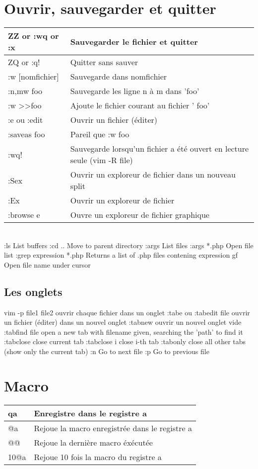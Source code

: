 \documentclass{article}
\begin{document}
\section{Ouvrir, sauvegarder et quitter}
\begin{tabular}{|p{3cm}| l|  }
	\hline
	ZZ or :wq or :x & Sauvegarder le fichier et quitter\\ \hline
	ZQ or :q! & Quitter sans sauver\\ \hline
	:w [nomfichier]& Sauvegarde dans nomfichier \\ \hline
	:n,mw foo & Sauvegarde les ligne n à m dans 'foo' \\ \hline
	:w \textgreater \textgreater  foo & Ajoute le fichier courant au fichier ' foo'\\ \hline
	:e ou :edit & Ouvrir un fichier (éditer) \\ \hline
	:saveas  foo & Pareil que :w foo \\ \hline
	:wq! & Sauvegarde lorsqu'un fichier a été ouvert en lecture seule (vim -R file)\\ \hline
	:Sex & Ouvrir un exploreur de fichier  dans un nouveau split\\ \hline
	:Ex & Ouvrir un exploreur de fichier\\ \hline
	:browse e 	& Ouvre un exploreur de fichier graphique\\ \hline
\end{tabular}\\
	
	:ls 	List buffers
	:cd .. 	Move to parent directory
	:args 	List files
	:args *.php 	Open file list
	:grep expression *.php 	Returns a list of .php files contening expression
	gf 	Open file name under cursor
\subsection{Les onglets}
	vim -p file1 file2 ouvrir chaque fichier dans un onglet
	:tabe  ou :tabedit {file}   ouvrir un fichier (éditer) dans un nouvel onglet
	:tabnew 		ouvrir un nouvel onglet vide
	:tabfind {file}   open a new tab with filename given, searching the 'path' to find it
	:tabclose         close current tab
	:tabclose {i}     close i-th tab
	:tabonly          close all other tabs (show only the current tab)
	:n	Go to next file
	:p	Go to previous file

\section{Macro}
\begin{tabular}{|p{3cm}| l|  }\hline
qa & Enregistre dans le registre a  \\ \hline
@a & Rejoue la macro enregistrée dans le registre a \\ \hline
@@ & Rejoue la dernière macro éxécutée \\ \hline
10@a & Rejoue 10 fois la macro du registre a \\ \hline
\end{tabular}\\
\end{document}
